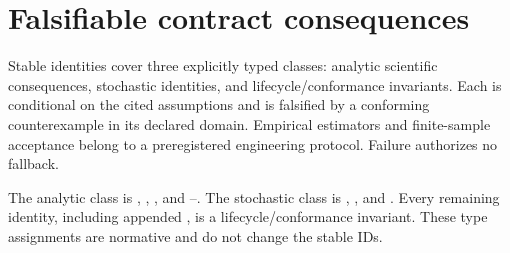 \section{Falsifiable contract consequences}
\label{sec:consequences}

Stable \Pred{} identities cover three explicitly typed classes: analytic
scientific consequences, stochastic identities, and lifecycle/conformance
invariants. Each is conditional on the cited assumptions and is falsified by a
conforming counterexample in its declared domain. Empirical estimators and
finite-sample acceptance belong to a preregistered engineering protocol.
Failure authorizes no fallback.

The analytic class is , , , and
--. The stochastic class is , , and
. Every remaining \Pred{} identity, including appended ,
is a lifecycle/conformance
invariant. These type assignments are normative and do not change the stable
IDs.

